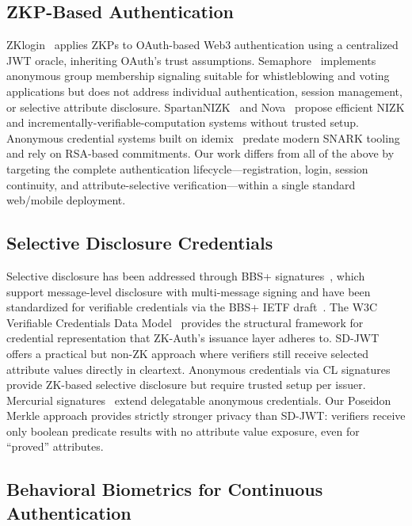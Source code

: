 \documentclass[journal,twoside,10pt]{IEEEtran}
\begin{document}
\subsection{ZKP-Based Authentication}

ZKlogin~\cite{zklogin} applies ZKPs to OAuth-based Web3 authentication using
a centralized JWT oracle, inheriting OAuth's trust assumptions.
Semaphore~\cite{semaphore} implements anonymous group membership signaling
suitable for whistleblowing and voting applications but does not address
individual authentication, session management, or selective attribute
disclosure. SpartanNIZK~\cite{spartan} and Nova~\cite{nova} propose efficient
NIZK and incrementally-verifiable-computation systems without trusted setup.
Anonymous credential systems built on idemix~\cite{idemix} predate modern
SNARK tooling and rely on RSA-based commitments. Our work differs from all of the above by
targeting the complete authentication lifecycle---registration, login,
session continuity, and attribute-selective verification---within a single
standard web/mobile deployment.

\subsection{Selective Disclosure Credentials}

Selective disclosure has been addressed through BBS+ signatures~\cite{bbs},
which support message-level disclosure with multi-message signing and have
been standardized for verifiable credentials via the BBS+ IETF
draft~\cite{bbsplus}. The W3C Verifiable Credentials Data Model~\cite{w3cvc}
provides the structural framework for credential representation that
ZK-Auth's issuance layer adheres to. SD-JWT~\cite{sdjwt} offers a practical
but non-ZK approach where verifiers still receive selected attribute values
directly in cleartext. Anonymous credentials via CL signatures~\cite{cl} provide
ZK-based selective disclosure but require trusted setup per issuer. Mercurial
signatures~\cite{mercurial} extend delegatable anonymous credentials. Our Poseidon Merkle approach provides strictly stronger privacy than
SD-JWT: verifiers receive only boolean predicate results with no attribute
value exposure, even for ``proved'' attributes.

\subsection{Behavioral Biometrics for Continuous Authentication}
\end{document}
